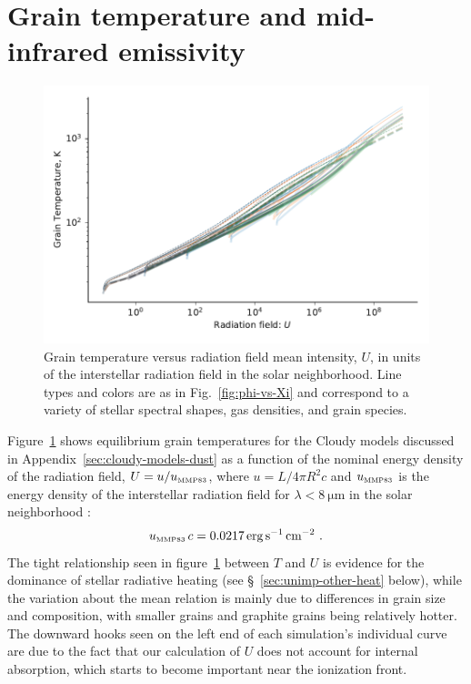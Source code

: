 \section{Grain temperature and mid-infrared emissivity}
\label{sec:grain-temp-emiss}


\begin{figure}
  \centering
  \includegraphics[width=\linewidth]{figs/grain-T-vs-U}
  \caption{Grain temperature versus radiation field mean intensity,
    \(U\), in units of the interstellar radiation field in the solar
    neighborhood.  Line types and colors are as in
    Fig.~\ref{fig:phi-vs-Xi} and correspond to a variety of stellar
    spectral shapes, gas densities, and grain species.}
  \label{fig:grain-T-vs-U}
\end{figure}

Figure~\ref{fig:grain-T-vs-U} shows equilibrium grain temperatures for
the Cloudy models discussed in Appendix~\ref{sec:cloudy-models-dust}
as a function of the nominal energy density of the radiation field,
\(U = u / u_{\text{\tiny MMP83}} \), where \(u = L / 4 \pi R^2 c\) and \(u_{\text{\tiny MMP83}}\) is the
energy density of the interstellar radiation field for
\(\lambda < \SI{8}{\um}\) in the solar neighborhood
\citep{Mathis:1983a}:
\begin{equation}
  \label{eq:u-mmp83}
  u_{\text{\tiny MMP83}}\,c = \SI{0.0217}{erg.s^{-1}.cm^{-2}} \ .
\end{equation}
The tight relationship seen in figure~\ref{fig:grain-T-vs-U} between
\(T\) and \(U\) is evidence for the dominance of stellar radiative
heating (see \S~\ref{sec:unimp-other-heat} below), while the variation
about the mean relation is mainly due to differences in grain size and
composition, with smaller grains and graphite grains being relatively
hotter.  The downward hooks seen on the left end of each simulation's
individual curve are due to the fact that our calculation of \(U\)
does not account for internal absorption, which starts to become
important near the ionization front.

